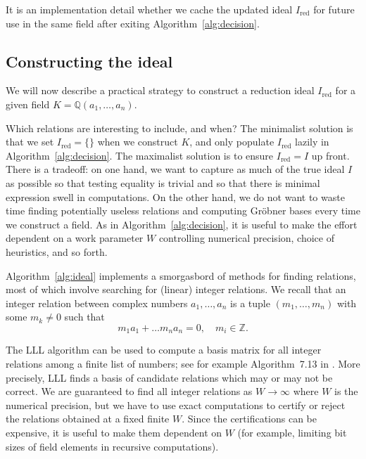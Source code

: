 \documentclass[11pt,a4paper]{article}
\begin{document}
It is an implementation detail whether we cache the updated
ideal $I_{\text{red}}$ for future use
in the same field after exiting Algorithm~\ref{alg:decision}.

\subsection{Constructing the ideal}

\label{sect:ideal}

We will now describe a practical strategy to construct a reduction ideal
$I_{\text{red}}$ for a given field $K = \mathbb{Q}(a_1,\ldots,a_n)$.

Which relations are interesting to include, and when?
The minimalist solution is that we set $I_{\text{red}} = \{\}$
when we construct $K$, and only populate $I_{\text{red}}$
lazily in Algorithm~\ref{alg:decision}.
The maximalist solution is to ensure
$I_{\text{red}} = I$ up front.
There is a tradeoff: on one hand, we want to capture as much of 
the true ideal $I$ as possible so that testing equality is trivial
and so that there is minimal expression swell in computations.
On the other hand, we do not want to waste time
finding potentially useless relations and computing Gr\"{o}bner bases every time we construct
a field.
As in Algorithm~\ref{alg:decision}, it is useful to
make the effort dependent on a work parameter $W$
controlling numerical precision, choice of heuristics,
and so forth.

Algorithm~\ref{alg:ideal} implements a smorgasbord of methods for
finding relations, most of which involve
searching for (linear) integer relations.
We recall that an integer relation between
complex numbers $a_1,\ldots,a_n$ is a tuple $(m_1, \ldots, m_n)$ with some $m_k \ne 0$
such that
$$m_1 a_1 + \ldots m_n a_n = 0, \quad m_i \in \mathbb{Z}.$$

The LLL algorithm can be used to compute a basis
matrix for all integer relations among
a finite list of numbers; see for example Algorithm~7.13 in \cite{Kau2005}.
More precisely, LLL finds a basis of candidate
relations which may or may not be correct.
We are guaranteed to find all integer relations
as $W \to \infty$ where $W$ is the numerical precision,
but we have to use exact computations to certify or reject the relations
obtained at a fixed finite $W$. Since the certifications can
be expensive, it is useful to make them dependent on $W$ (for
example, limiting bit sizes of field elements in recursive computations).
\end{document}
